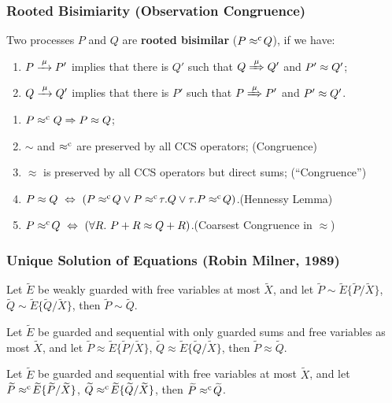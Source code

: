 \begin{frame}
\frametitle{Rooted Bisimiarity (Observation Congruence)}
\begin{definition}
Two processes $P$ and $Q$ are \textbf{rooted bisimilar} ($P\mathrel{\approx^{\mathrm{c}}}\! Q$), if we have:
\begin{enumerate}
 \item  $P \arr\mu P'$ implies that there is $Q'$ such that $Q
   \Arr\mu Q'$ and $P' \approx Q'$;
 \item  $Q \arr\mu Q'$ implies that there is $P'$ such that $P
   \Arr\mu P'$ and $P' \approx Q'$\enspace.
\end{enumerate}
\end{definition}
\begin{theorem}
\begin{enumerate}
\item $P \mathrel{\approx^{\mathrm{c}}} Q \Rightarrow P \approx Q$;
\item $\sim$ and $\mathrel{\approx^{\mathrm{c}}}$ are preserved by all CCS operators; \hfill
  (Congruence)
\item $\approx$ is preserved by all CCS operators but direct sums;\hfill
  (``Congruence'')
\item $P \approx Q\ \Leftrightarrow\ (P \mathrel{\approx^{\mathrm{c}}}\! Q
  \vee P \mathrel{\approx^{\mathrm{c}}}\! \tau.Q \vee \tau.P \mathrel{\approx^{\mathrm{c}}}\! Q)$.\hfill (Hennessy Lemma)
\item $P \mathrel{\approx^{\mathrm{c}}}\! Q\ \Leftrightarrow\ ( \forall R.\
  P + R \approx Q + R)$.\hfill (Coarsest Congruence in $\approx$)
\end{enumerate}
\end{theorem}
\end{frame}

\begin{frame}
\frametitle{Unique Solution of Equations (Robin Milner, 1989)}
\begin{theorem}
Let $\tilde{E}$ be weakly guarded with free variables at most
$\tilde{X}$, and let $\tilde{P}\sim\tilde{E}\{\tilde{P}/\tilde{X}\}$,
$\tilde{Q}\sim\tilde{E}\{\tilde{Q}/\tilde{X}\}$, then $\tilde{P}\sim\tilde{Q}$.
\end{theorem}

\begin{theorem}
Let $\tilde{E}$ be guarded and sequential with only guarded sums and
free variables as most $\tilde{X}$, and let
$\tilde{P}\approx\tilde{E}\{\tilde{P}/\tilde{X}\}$,
$\tilde{Q}\approx\tilde{E}\{\tilde{Q}/\tilde{X}\}$, then $\tilde{P}\approx\tilde{Q}$.
\end{theorem}

\begin{theorem}
Let $\tilde{E}$ be guarded and sequential with free variables at most
$\tilde{X}$, and let $\widetilde{P}\mathrel{\approx^{\mathrm{c}}}\!\widetilde{E}\{\widetilde{P}/\widetilde{X}\}$,
$\widetilde{Q}\mathrel{\approx^{\mathrm{c}}}\!\widetilde{E}\{\widetilde{Q}/\widetilde{X}\}$, then $\widetilde{P}\mathrel{\approx^{\mathrm{c}}}\!\widetilde{Q}$.
\end{theorem}
\end{frame}

